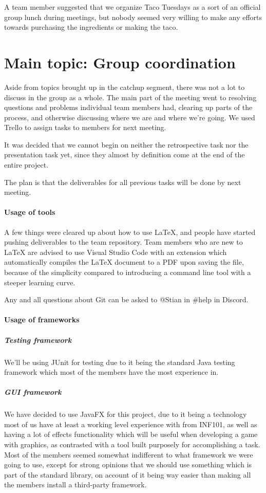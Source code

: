 \documentclass{article}
\begin{document}
A team member suggested that we organize Taco Tuesdays as a sort of an official group lunch during meetings, but nobody seemed very willing to make any efforts towards purchasing the ingredients or making the taco.

\section{Main topic: Group coordination}

Aside from topics brought up in the catchup segment, there was not a lot to discuss in the group as a whole. The main part of the meeting went to resolving questions and problems individual team members had, clearing up parts of the process, and otherwise discussing where we are and where we're going. We used Trello to assign tasks to members for next meeting.

It was decided that we cannot begin on neither the retrospective task nor the presentation task yet, since they almost by definition come at the end of the entire project.

The plan is that the deliverables for all previous tasks will be done by next meeting.

\paragraph{Usage of tools}

A few things were cleared up about how to use LaTeX, and people have started pushing deliverables to the team repository. Team members who are new to LaTeX are advised to use Visual Studio Code with an extension which automatically compiles the LaTeX document to a PDF upon saving the file, because of the simplicity compared to introducing a command line tool with a steeper learning curve.

Any and all questions about Git can be asked to @Stian in \#help in Discord.

\paragraph{Usage of frameworks}

\subparagraph{Testing framework}

We'll be using JUnit for testing due to it being the standard Java testing framework which most of the members have the most experience in.

\subparagraph{GUI framework}

We have decided to use JavaFX for this project, due to it being a technology most of us have at least a working level experience with from INF101, as well as having a lot of effects functionality which will be useful when developing a game with graphics, as contrasted with a tool built purposely for accomplishing a task. Most of the members seemed somewhat indifferent to what framework we were going to use, except for strong opinions that we should use something which is part of the standard library, on account of it being way easier than making all the members install a third-party framework.
\end{document}
